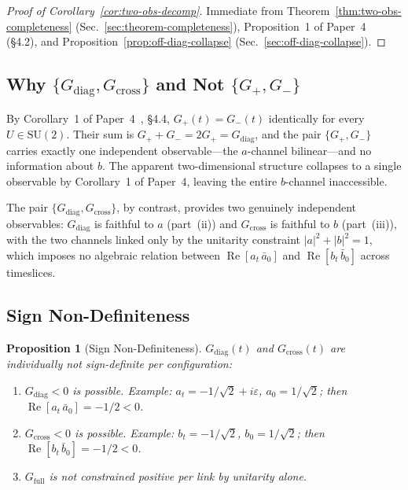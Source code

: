 \documentclass[12pt]{article}
\numberwithin{equation}{section}
\theoremstyle{plain}
\newtheorem{proposition}{Proposition}[section]
\theoremstyle{definition}
\theoremstyle{remark}
\newcommand{\su}{\mathrm{SU}}              %
\newcommand{\Gdiag}{G_{\mathrm{diag}}}     %
\newcommand{\Gcross}{G_{\mathrm{cross}}}   %
\newcommand{\Gfull}{G_{\mathrm{full}}}     %
\begin{document}
	\begin{proof}[Proof of Corollary~\ref{cor:two-obs-decomp}]
		Immediate from Theorem~\ref{thm:two-obs-completeness}
		(Sec.~\ref{sec:theorem-completeness}), Proposition~1 of
		Paper~4~\cite{FirestoneP4} (\S4.2), and
		Proposition~\ref{prop:off-diag-collapse}
		(Sec.~\ref{sec:off-diag-collapse}).
	\end{proof}
	
	\subsection{Why \texorpdfstring{$\{\Gdiag,\Gcross\}$}{\{Gdiag, Gcross\}}
		and Not \texorpdfstring{$\{G_{+},G_{-}\}$}{\{G+, G-\}}}
	\label{sec:why-G}
	
	By Corollary~1 of Paper~4~\cite{FirestoneP4}, \S4.4, $G_{+}(t) =
	G_{-}(t)$ identically for every $U\in\su(2)$.  Their sum is
	$G_{+} + G_{-} = 2 G_{+} = \Gdiag$, and the pair $\{G_{+},G_{-}\}$
	carries exactly one independent observable---the $a$-channel
	bilinear---and no information about $b$.  The apparent
	two-dimensional structure collapses to a single observable by
	Corollary~1 of Paper~4, leaving the entire $b$-channel inaccessible.
	
	The pair $\{\Gdiag,\Gcross\}$, by contrast, provides two genuinely
	independent observables: $\Gdiag$ is faithful to $a$ (part~(ii)) and
	$\Gcross$ is faithful to $b$ (part~(iii)), with the two channels
	linked only by the unitarity constraint $|a|^{2}+|b|^{2}=1$, which
	imposes no algebraic relation between $\operatorname{Re}[a_t\,
	\bar{a}_0]$ and $\operatorname{Re}[b_t\,\bar{b}_0]$ across timeslices.
	
	\subsection{Sign Non-Definiteness}
	\label{sec:prop-sign-nondef}
	
	\begin{proposition}[Sign Non-Definiteness]
		\label{prop:sign-nondef}
		$\Gdiag(t)$ and $\Gcross(t)$ are individually not sign-definite
		per configuration:
		\begin{enumerate}
			\item[(a)] $\Gdiag < 0$ is possible.  Example:
			$a_t = -1/\sqrt{2} + i\varepsilon$, $a_0 = 1/\sqrt{2}$;
			then $\operatorname{Re}[a_t\,\bar{a}_0] = -1/2 < 0$.
			
			\item[(b)] $\Gcross < 0$ is possible.  Example:
			$b_t = -1/\sqrt{2}$, $b_0 = 1/\sqrt{2}$;
			then $\operatorname{Re}[b_t\,\bar{b}_0] = -1/2 < 0$.
			
			\item[(c)] $\Gfull$ is not constrained positive per link by
			unitarity alone.
		\end{enumerate}
	\end{proposition}
	
\end{document}

